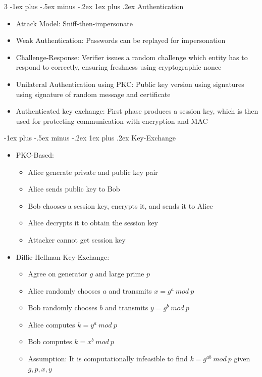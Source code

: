 \documentclass[10pt, landscape]{article}
\makeatletter
\renewcommand{\subsection}{\@startsection{subsection}{3}{0mm}%
                                {-1ex plus -.5ex minus -.2ex}%
                                {1ex plus .2ex}%
                                {\normalfont\small\bfseries}}%
\makeatother
\begin{document}
\begin{multicols*}{3}
\subsection{Authentication}
\begin{itemize}
    \item Attack Model: Sniff-then-impersonate
    \item Weak Authentication: Passwords can be replayed for impersonation
    \item Challenge-Response: Verifier issues a random challenge which entity has to respond to correctly, ensuring freshness using cryptographic nonce
    \item Unilateral Authentication using PKC: Public key version using signatures using signature of random message and certificate
    \item Authenticated key exchange: First phase produces a session key, which is then used for protecting communication with encryption and MAC
\end{itemize}

\subsection{Key-Exchange}
\begin{itemize}
    \item PKC-Based:
    \begin{itemize}
        \item Alice generate private and public key pair
        \item Alice sends public key to Bob
        \item Bob chooses a session key, encrypts it, and sends it to Alice
        \item Alice decrypts it to obtain the session key
        \item Attacker cannot get session key
    \end{itemize}
    \item Diffie-Hellman Key-Exchange:
    \begin{itemize}
        \item Agree on generator $g$ and large prime $p$
        \item Alice randomly chooses $a$ and transmits $x=g^a\ mod \ p$
        \item Bob randomly chooses $b$ and transmits $y=g^b\ mod\ p$
        \item Alice computes $k=y^a\ mod \ p$
        \item Bob computes $k=x^b\ mod\ p$
        \item Assumption: It is computationally infeasible to find $k=g^{ab}\ mod\ p$ given $g,p,x,y$
    \end{itemize}
\end{itemize}


\end{multicols*}
\end{document}
